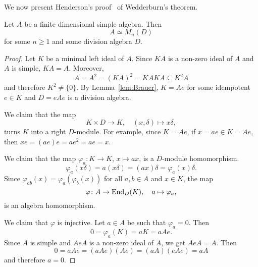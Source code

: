 
We now present Henderson's proof~\cite{MR184969}
of Wedderburn's theorem. 

\begin{theorem}[Wedderburn]
    Let $A$ be a finite-dimensional simple algebra. 
    Then 
    \[
    A\simeq M_n(D)
    \]
    for some $n\geq1$ and 
    some division algebra $D$. 
\end{theorem}

\begin{proof}
    Let $K$ be a minimal left ideal of $A$. Since $KA$ is a non-zero 
    ideal of $A$ and $A$ is simple, 
    $KA=A$. Moreover,  
	\[
	A=A^2=(KA)^2=KAKA\subseteq K^2A
	\]
	and therefore $K^2\ne\{0\}$. By Lemma~\ref{lem:Brauer}, 
    $K=Ae$ for some idempotent $e\in K$ and 
    $D=eAe$ is a division algebra. 

    We claim that the map 
    \[
    K\times D\to K,\quad (x,\delta)\mapsto x\delta, 
    \]
    turns $K$ into a right $D$-module. For example, since $K=Ae$, 
    if $x=ae\in K=Ae$, then $xe=(ae)e=ae^2=ae=x$. 
    
    We claim that the map 
    $\varphi_a\colon K\to K$, $x\mapsto ax$, is a $D$-module homomorphism. 
    \[
	\varphi_a(x\delta)=a(x\delta)=(ax)\delta=\varphi_a(x)\delta.
	\]  
    Since $\varphi_{ab}(x)=\varphi_a(\varphi_b(x))$ 
    for all 
    $a,b\in A$ and $x\in K$, the map 
    \[
    \varphi\colon A\to\operatorname{End}_D(K),\quad a\mapsto\varphi_a,
    \]
    is an algebra homomorphism. 

    We claim that $\varphi$ is injective. Let $a\in A$ be such that 
    $\varphi_a=0$. Then 
    \[
	0=\varphi_a(K)=aK=aAe.
	\]
    Since $A$ is simple and $AeA$ is a non-zero ideal of $A$, 
    we get $AeA=A$. Then 
    \[
    0=aAe=(aAe)(Ae)=(aA)(eAe)=aA
    \]
    and therefore $a=0$. 


\end{proof}
